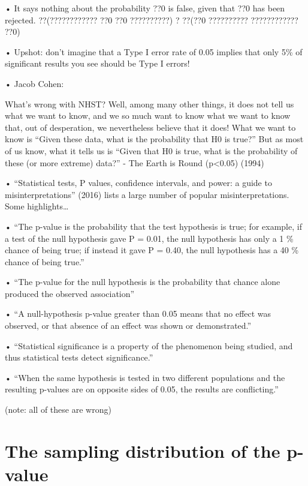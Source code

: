 \documentclass[
  letterpaper,
  DIV=11,
  numbers=noendperiod]{scrreprt}
\begin{document}
• It says nothing about the probability ??0 is false, given that ??0 has
been rejected. ??(???????????? ??0 \textbar{} ??0 ??????????) ? ??(??0
?????????? \textbar{} ???????????? ??0)

• Upshot: don't imagine that a Type I error rate of 0.05 implies that
only 5\% of significant results you see should be Type I errors!

• Jacob Cohen:

What's wrong with NHST? Well, among many other things, it does not tell
us what we want to know, and we so much want to know what we want to
know that, out of desperation, we nevertheless believe that it does!
What we want to know is ``Given these data, what is the probability that
H0 is true?'' But as most of us know, what it tells us is ``Given that
H0 is true, what is the probability of these (or more extreme) data?'' -
The Earth is Round (p\textless0.05) (1994)

• ``Statistical tests, P values, confidence intervals, and power: a
guide to misinterpretations'' (2016) lists a large number of popular
misinterpretations. Some highlights\ldots{}

• ``The p-value is the probability that the test hypothesis is true; for
example, if a test of the null hypothesis gave P = 0.01, the null
hypothesis has only a 1 \% chance of being true; if instead it gave P =
0.40, the null hypothesis has a 40 \% chance of being true.''

• ``The p-value for the null hypothesis is the probability that chance
alone produced the observed association''

• ``A null-hypothesis p-value greater than 0.05 means that no effect was
observed, or that absence of an effect was shown or demonstrated.''

• ``Statistical significance is a property of the phenomenon being
studied, and thus statistical tests detect significance.''

• ``When the same hypothesis is tested in two different populations and
the resulting p-values are on opposite sides of 0.05, the results are
conflicting.''

(note: all of these are wrong)

\hypertarget{the-sampling-distribution-of-the-p-value}{%
\section{The sampling distribution of the
p-value}\label{the-sampling-distribution-of-the-p-value}}
\end{document}
